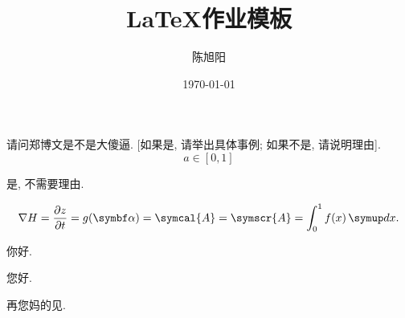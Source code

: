 \documentclass[chinese]{assignment}
\title{\LaTeX 作业模板}
\author{陈旭阳}
\date{\today}
\institute{同济大学数学科学学院}
\begin{document}
    \maketitle

    \begin{problem}
        请问郑博文是不是大傻逼. [如果是, 请举出具体事例; 如果不是, 请说明理由].
        \begin{equation}
            a\in[0, 1]
        \end{equation}
    \end{problem}

    \begin{solution}
        是, 不需要理由.

        \begin{equation}
            \nabla{H}=\frac{\partial{z}}{\partial{t}}=g(\vect{\alpha}) = \symcal{A} = \symscr{A} = \int_{0}^{1}f(x)\diff x.
        \end{equation}

        你好.


    \end{solution}

    \clearpage

    您好.

    \begin{problem}
        再您妈的见.
    \end{problem}
\end{document}
